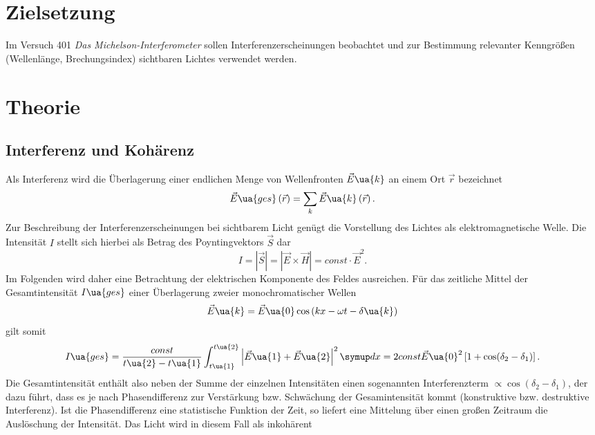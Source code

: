\setcounter{page}{1}
\section*{Zielsetzung}
Im Versuch 401 \emph{Das Michelson-Interferometer} sollen Interferenzerscheinungen beobachtet und zur Bestimmung
relevanter Kenngrößen (Wellenlänge, Brechungsindex) sichtbaren Lichtes verwendet werden. %
\section{Theorie}
\subsection{Interferenz und Kohärenz}
Als Interferenz wird die Überlagerung einer endlichen Menge von Wellenfronten $\vec{E}\ua{k}$ an einem Ort $\vec{r}$ bezeichnet
\begin{equation}
  \vec{E}\ua{ges}\left(\vec{r}\right) = \sum_k \vec{E}\ua{k}\left(\vec{r}\right).
\end{equation}
Zur Beschreibung der Interferenzerscheinungen bei sichtbarem Licht genügt die Vorstellung des Lichtes als elektromagnetische
Welle. Die Intensität $I$ stellt sich hierbei als Betrag des Poyntingvektors $\vec{S}$ dar
\begin{equation}
  I = \left|\vec{S}\right| = \left| \vec{E} \times \vec{H}\right| = const \cdot \vec{E}^2.
\end{equation}
Im Folgenden wird daher eine Betrachtung der elektrischen Komponente des Feldes ausreichen.
Für das zeitliche Mittel der Gesamtintensität $I\ua{ges}$ einer Überlagerung zweier monochromatischer Wellen
\begin{equation}
  \vec{E}\ua{k} = \vec{E}\ua{0}\cos\left(kx - \omega t - \delta\ua{k} \right)
\end{equation}
gilt somit
\begin{equation}
  I\ua{ges} = \frac{const}{t\ua{2}- t\ua{1}}\int_{t\ua{1}}^{t\ua{2}}\left| \vec{E}\ua{1} + \vec{E}\ua{2} \right|^2 \dif{x} = 2const\vec{E}\ua{0}^2\left[1 + \cos(\delta_2- \delta_1)\right].
\end{equation}
Die Gesamtintensität enthält also neben der Summe der einzelnen Intensitäten einen sogenannten Interferenzterm $\propto \cos(\delta_2-\delta_1)$, der dazu führt, dass
es je nach Phasendifferenz zur Verstärkung bzw. Schwächung der Gesamintensität kommt (konstruktive bzw. destruktive Interferenz). Ist die Phasendifferenz eine
statistische Funktion der Zeit, so liefert eine Mittelung über einen großen Zeitraum die Auslöschung der Intensität. Das Licht wird in diesem Fall als inkohärent
